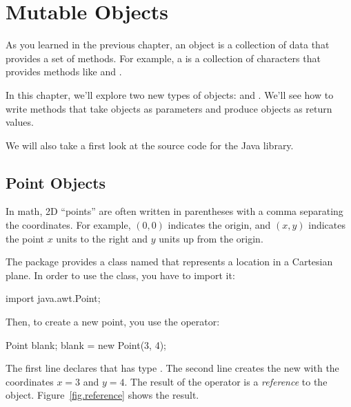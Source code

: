 \chapter{Mutable Objects}
\label{mutable}


As you learned in the previous chapter, an object is a collection of data that provides a set of methods.
For example, a  is a collection of characters that provides methods like  and .

In this chapter, we'll explore two new types of objects:  and .
We'll see how to write methods that take objects as parameters and produce objects as return values.

We will also take a first look at the source code for the Java library.


\section{Point Objects}
\label{point}


In math, 2D ``points'' are often written in parentheses with a comma separating the coordinates.
For example, $(0,0)$ indicates the origin, and $(x,y)$ indicates the point $x$ units to the right and $y$ units up from the origin.


The  package provides a class named  that represents a location in a Cartesian plane.
In order to use the  class, you have to import it:

\begin{code}
import java.awt.Point;
\end{code}


Then, to create a new point, you use the  operator:

\begin{code}
Point blank;
blank = new Point(3, 4);
\end{code}


The first line declares that  has type .
The second line creates the new  with the coordinates $x=3$ and $y=4$.
The result of the  operator is a {\em reference} to the object.
Figure~\ref{fig.reference} shows the result.


